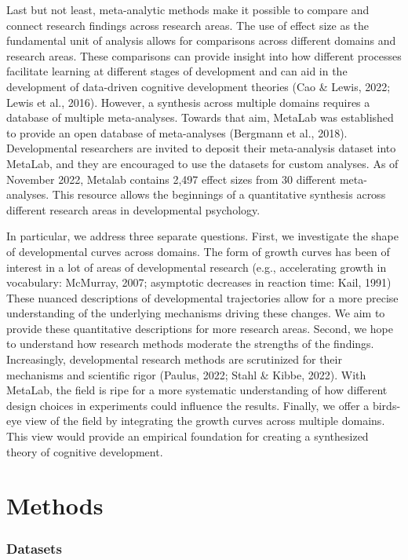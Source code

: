 \documentclass[10pt, letterpaper]{article}
\begin{document}
Last but not least, meta-analytic methods make it possible to compare
and connect research findings across research areas. The use of effect
size as the fundamental unit of analysis allows for comparisons across
different domains and research areas. These comparisons can provide
insight into how different processes facilitate learning at different
stages of development and can aid in the development of data-driven
cognitive development theories (Cao \& Lewis, 2022; Lewis et al., 2016).
However, a synthesis across multiple domains requires a database of
multiple meta-analyses. Towards that aim, MetaLab was established to
provide an open database of meta-analyses (Bergmann et al., 2018).
Developmental researchers are invited to deposit their meta-analysis
dataset into MetaLab, and they are encouraged to use the datasets for
custom analyses. As of November 2022, Metalab contains 2,497 effect
sizes from 30 different meta-analyses. This resource allows the
beginnings of a quantitative synthesis across different research areas
in developmental psychology.

In particular, we address three separate questions. First, we
investigate the shape of developmental curves across domains. The form
of growth curves has been of interest in a lot of areas of developmental
research (e.g., accelerating growth in vocabulary: McMurray, 2007;
asymptotic decreases in reaction time: Kail, 1991) These nuanced
descriptions of developmental trajectories allow for a more precise
understanding of the underlying mechanisms driving these changes. We aim
to provide these quantitative descriptions for more research areas.
Second, we hope to understand how research methods moderate the
strengths of the findings. Increasingly, developmental research methods
are scrutinized for their mechanisms and scientific rigor (Paulus, 2022;
Stahl \& Kibbe, 2022). With MetaLab, the field is ripe for a more
systematic understanding of how different design choices in experiments
could influence the results. Finally, we offer a birds-eye view of the
field by integrating the growth curves across multiple domains. This
view would provide an empirical foundation for creating a synthesized
theory of cognitive development.

\hypertarget{methods}{%
\section{Methods}\label{methods}}

\hypertarget{datasets}{%
\subsubsection{Datasets}\label{datasets}}
\end{document}
